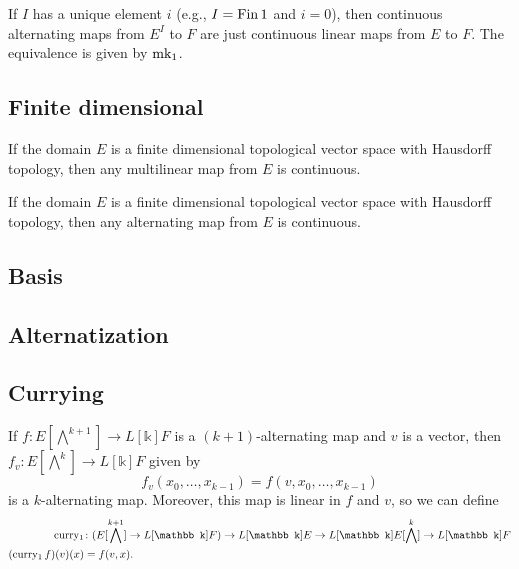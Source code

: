 \begin{definition}%
  \label{def:cont-alt-map-one}
  If \(I\) has a unique element \(i\) (e.g., \(I = \operatorname{Fin} 1\) and \(i = 0\)),
  then continuous alternating maps from \(E^{I}\) to \(F\) are just continuous linear maps from \(E\) to \(F\).
  The equivalence is given by \(\operatorname{mk_1}\).
\end{definition}

\subsection{Finite dimensional}%
\label{sec:finite-dimensional}

\begin{theorem}%
  \label{thm:cont-mult-map-findim}
  If the domain \(E\) is a finite dimensional topological vector space with Hausdorff topology,
  then any multilinear map from \(E\) is continuous.
\end{theorem}

\begin{theorem}%
  \label{thm:cont-alt-map-findim}
  If the domain \(E\) is a finite dimensional topological vector space with Hausdorff topology,
  then any alternating map from \(E\) is continuous.
\end{theorem}

\subsection{Basis}%
\label{sec:basis}


\subsection{Alternatization}%
\label{sec:alternatization}


\subsection{Currying}%
\label{sec:currying}

\begin{definition}%
  \label{def:cont-alt-curry-fin}
  If \(f\colon E [\bigwedge^{k + 1}]\to L[\mathbb k] F\) is a \((k + 1)\)-alternating map and \(v\) is a vector,
  then \(f_{v}\colon E [\bigwedge^{k}]\to L[\mathbb k] F\) given by
  \[
    f_{v}(x_{0}, \dots, x_{k - 1})=f(v, x_{0}, \dots, x_{k - 1})
  \]
  is a \(k\)-alternating map.
  Moreover, this map is linear in \(f\) and \(v\), so we can define
  \begin{align}
    \curryOne&\colon (E [\bigwedge^{k + 1}]\to L[\mathbb k] F) \to L[\mathbb k] E \to L[\mathbb k] E [\bigwedge^{k}]\to L[\mathbb k] F\\
    (\curryOne f)(v)(x) &= f(v, x).
  \end{align}
\end{definition}

